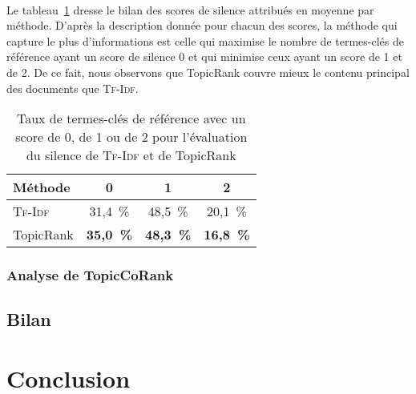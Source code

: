         ~\\Le
        tableau~\ref{tab:main-automatic_evaluation_of_keyphrase_annotation-results-topicrank-silence_score_ratio}
        dresse le bilan des scores de silence attribués en moyenne par méthode.
        D'après la description donnée pour chacun des scores, la méthode qui
        capture le plus d'informations est celle qui maximise le nombre de
        termes-clés de référence ayant un score de silence 0 et qui minimise
        ceux ayant un score de 1 et de 2. De ce fait, nous observons que
        TopicRank couvre mieux le contenu principal des documents que
        \textsc{Tf-Idf}.
        \begin{table}[h!]
          \centering
          \begin{tabular}{l|c|c|c}
            \toprule
            \textbf{Méthode} & \textbf{0} & \textbf{1} & \textbf{2}\\
            \hline
            \textsc{Tf-Idf} & 31,4~\% & 48,5~\% & 20,1~\%\\
            TopicRank & \textbf{35,0~\%} & \textbf{48,3~\%} & \textbf{16,8~\%}\\
            \bottomrule
          \end{tabular}
          \caption{Taux de termes-clés de référence avec un score de 0, de 1 ou
                   de 2 pour l'évaluation du silence de \textsc{Tf-Idf} et de
                   TopicRank
                   \label{tab:main-automatic_evaluation_of_keyphrase_annotation-results-topicrank-silence_score_ratio}}
        \end{table}

      \subsubsection{Analyse de TopicCoRank}
      \label{subsubsec:main-domain_specific_keyphrase_annotation-manual_evaluation-analysis-topiccorank}
        \TODO{\dots}

    \subsection{Bilan}
    \label{subsec:main-domain_specific_keyphrase_annotation-manual_evaluation-conclusion}



  \section{Conclusion}
  \label{sec:main-domain_specific_keyphrase_annotation-conclusion}
    \TODO{\dots}

